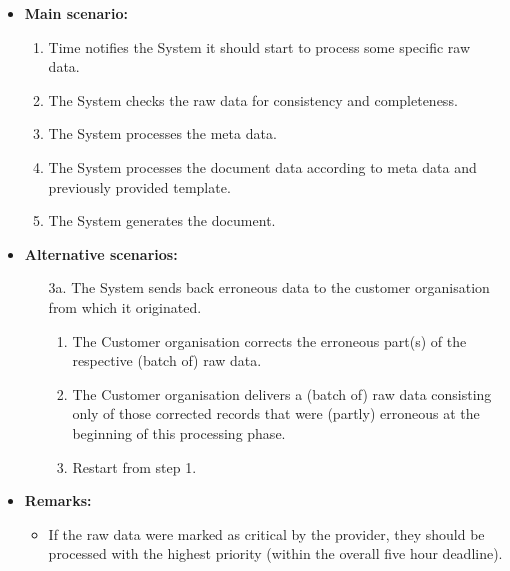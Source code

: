 \documentclass[a4paper,10pt]{article}
\begin{document}
\begin{itemize}
    \item \textbf{Main scenario:} 
    \begin{enumerate}
    	\item Time notifies the System it should start to process some specific raw data.
       \item The System checks the raw data for consistency and completeness.
       \item The System processes the meta data.
       \item The System processes the document data according to meta data and previously provided template.
       \item The System generates the document.
    \end{enumerate}
    \item \textbf{Alternative scenarios:} 
    \begin{enumerate}
        \item [3a.] The System sends back erroneous data to the customer organisation from which it originated.
        \begin{enumerate}
        \item The Customer organisation corrects the erroneous part(s) of the respective (batch of) raw data.
        \item  The Customer organisation delivers a (batch of) raw data consisting only of those corrected records that were (partly) erroneous at the beginning of this processing phase.
        \item Restart from step 1.
          \end{enumerate}
    \end{enumerate}
    \item \textbf{Remarks:}
        \begin{itemize}
        	\item If the raw data were marked as critical by the provider, they should be processed with the highest priority (within the overall five hour deadline).
        \end{itemize}
\end{itemize}
\end{document}
